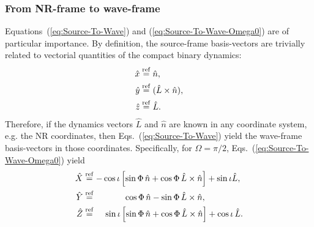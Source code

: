 \documentclass[11pt,tightenlines,article,amssymb,amsmath,amsfonts,superscriptaddress,nofootinbib]{revtex4}
\newcommand{\nNR}{\hat{n}}
\newcommand{\lNR}{\hat L}
\newcommand{\ExS}{{{\hat x}}}
\newcommand{\EyS}{{{\hat y}}}
\newcommand{\EzS}{{{\hat z}}}
\newcommand{\ExW}{\hat X}
\newcommand{\EyW}{\hat Y}
\newcommand{\EzW}{\hat Z}
\newcommand{\phiRef}{\Phi} %
\newcommand{\equalref}{\overset{\rm ref}{=}}
\begin{document}
\subsubsection{From NR-frame to wave-frame}


Equations~(\ref{eq:Source-To-Wave}) and
(\ref{eq:Source-To-Wave-Omega0}) are of particular importance.  By
definition, the source-frame basis-vectors are trivially related to
vectorial quantities of the compact binary dynamics:
\begin{subequations}
  \begin{align}
    \ExS&\equalref \nNR,\\
    \EyS&\equalref (\lNR\times\nNR),\\
    \EzS&\equalref \lNR.
  \end{align}
\end{subequations}
Therefore, if the dynamics vectors $\lNR$ and $\nNR$ are known in any
coordinate system, e.g. the NR coordinates, then
Eqs.~(\ref{eq:Source-To-Wave}) yield the wave-frame basis-vectors in those
coordinates.  Specifically, for $\Omega=\pi/2$,
Eqs.~(\ref{eq:Source-To-Wave-Omega0}) yield
\begin{subequations}
  \begin{align}
    \ExW &\equalref-\cos\iota\left[\sin\phiRef\,\nNR +\cos\phiRef\,\lNR\times\nNR\right]+\sin\iota\lNR,\\
    \EyW &\equalref \qquad\quad\;\,\cos\phiRef\,\nNR -\sin\phiRef\,\lNR\times\nNR,\\
\label{eq:Z}
    \EzW&\equalref\;\;\;\; \sin \iota\left[\sin\phiRef\,\nNR +\cos\phiRef\,\lNR\times\nNR\right]
    +\cos \iota \,\lNR.
  \end{align}
\end{subequations}
\end{document}
